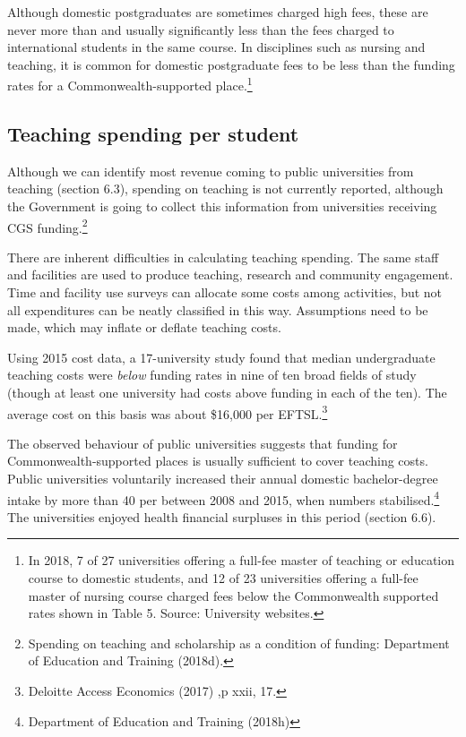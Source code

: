 \documentclass[]{book}
\begin{document}
Although domestic postgraduates are sometimes charged high fees, these are never more than and usually significantly less than the fees charged to international students in the same course. In disciplines such as nursing and teaching, it is common for domestic postgraduate fees to be less than the funding rates for a Commonwealth-supported place.\footnote{In 2018, 7 of 27 universities offering a full-fee master of teaching or education course to domestic students, and 12 of 23 universities offering a full-fee master of nursing course charged fees below the Commonwealth supported rates shown in Table 5. Source: University websites.}

\hypertarget{teaching-spending-per-student}{%
\subsection{Teaching spending per student}\label{teaching-spending-per-student}}

Although we can identify most revenue coming to public universities from teaching (section 6.3), spending on teaching is not currently reported, although the Government is going to collect this information from universities receiving CGS funding.\footnote{Spending on teaching and scholarship as a condition of funding: Department of Education and Training (2018d).}

There are inherent difficulties in calculating teaching spending. The same staff and facilities are used to produce teaching, research and community engagement. Time and facility use surveys can allocate some costs among activities, but not all expenditures can be neatly classified in this way. Assumptions need to be made, which may inflate or deflate teaching costs.

Using 2015 cost data, a 17-university study found that median undergraduate teaching costs were \emph{below} funding rates in nine of ten broad fields of study (though at least one university had costs above funding in each of the ten). The average cost on this basis was about \$16,000 per EFTSL.\footnote{Deloitte Access Economics (2017) ,p xxii, 17.}

The observed behaviour of public universities suggests that funding for Commonwealth-supported places is usually sufficient to cover teaching costs. Public universities voluntarily increased their annual domestic bachelor-degree intake by more than 40 per between 2008 and 2015, when numbers stabilised.\footnote{Department of Education and Training (2018h)} The universities enjoyed health financial surpluses in this period (section 6.6).
\end{document}
